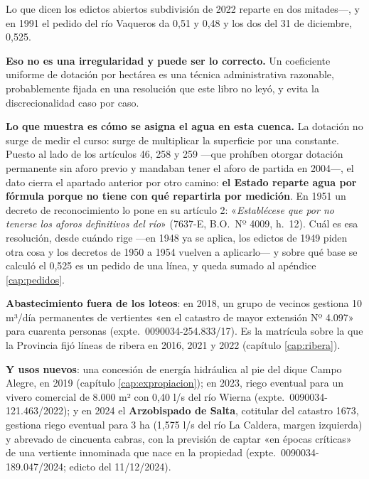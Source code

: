 \begin{ficha}{Lo que dicen los edictos abiertos}
subdivisión de 2022 reparte en dos mitades---, y en 1991 el pedido del río Vaqueros da 0,51 y 0,48 y los dos del 31 de diciembre, 0,525.

\begin{cautela}
\textbf{Eso no es una irregularidad y puede ser lo correcto.} Un coeficiente uniforme de
dotación por hectárea es una técnica administrativa razonable, probablemente fijada en una
resolución que este libro no leyó, y evita la discrecionalidad caso por caso.

\textbf{Lo que muestra es cómo se asigna el agua en esta cuenca.} La dotación no surge de
medir el curso: surge de multiplicar la superficie por una constante. Puesto al lado de los
artículos 46, 258 y 259 ---que prohíben otorgar dotación permanente sin aforo previo y mandaban
tener el aforo de partida en 2004---, el dato cierra el apartado anterior por otro camino:
\textbf{el Estado reparte agua por fórmula porque no tiene con qué repartirla por medición}. En 1951 un decreto de reconocimiento lo pone en su artículo 2: «\textit{Establécese que por no tenerse los aforos definitivos del río}» (7637-E, B.O.\ Nº 4009, h.\ 12).
Cuál es esa resolución, desde cuándo rige ---en 1948 ya se aplica, los edictos de 1949 piden otra cosa y los decretos de 1950 a 1954 vuelven a aplicarlo--- y sobre qué base se calculó el 0,525 es un pedido de
una línea, y queda sumado al apéndice \ref{cap:pedidos}.
\end{cautela}

\textbf{Abastecimiento fuera de los loteos}: en 2018, un grupo de vecinos gestiona 10 m³/día permanentes de vertientes «en el catastro de mayor extensión Nº 4.097» para cuarenta personas (expte.\ 0090034-254.833/17). Es la matrícula sobre la que la Provincia fijó líneas de ribera en 2016, 2021 y 2022 (capítulo \ref{cap:ribera}).

\textbf{Y usos nuevos}: una concesión de energía hidráulica al pie del dique Campo Alegre, en 2019 (capítulo \ref{cap:expropiacion}); en 2023, riego eventual para un vivero comercial de 8.000 m² con 0,40 l/s del río Wierna (expte.\ 0090034-121.463/2022); y en 2024 el \textbf{Arzobispado de Salta}, cotitular del catastro 1673, gestiona riego eventual para 3 ha (1,575 l/s del río La Caldera, margen izquierda) y abrevado de cincuenta cabras, con la previsión de captar «en épocas críticas» de una vertiente innominada que nace en la propiedad (expte.\ 0090034-189.047/2024; edicto del 11/12/2024).
\end{ficha}

